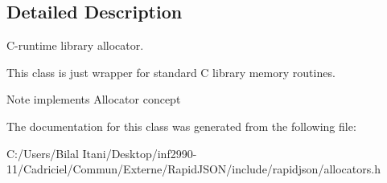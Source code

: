 \subsection{Detailed Description}
C-\/runtime library allocator. 

This class is just wrapper for standard C library memory routines. \begin{DoxyNote}{Note}
implements Allocator concept 
\end{DoxyNote}


The documentation for this class was generated from the following file\+:\begin{DoxyCompactItemize}
\item 
C\+:/\+Users/\+Bilal Itani/\+Desktop/inf2990-\/11/\+Cadriciel/\+Commun/\+Externe/\+Rapid\+J\+S\+O\+N/include/rapidjson/allocators.\+h\end{DoxyCompactItemize}
